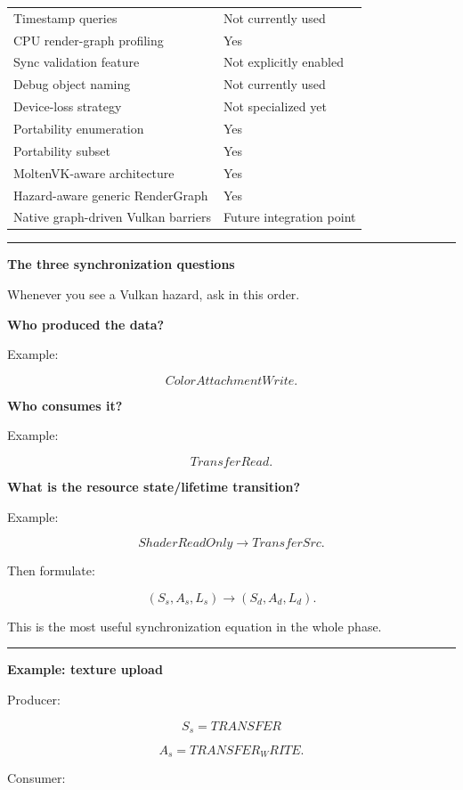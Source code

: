 {\begin{longtable}[]{@{}
  >{\raggedright\arraybackslash}p{}
  >{\raggedright\arraybackslash}p{}@{}}
Timestamp queries & Not currently used \\
CPU render-graph profiling & Yes \\
Sync validation feature & Not explicitly enabled \\
Debug object naming & Not currently used \\
Device-loss strategy & Not specialized yet \\
Portability enumeration & Yes \\
Portability subset & Yes \\
MoltenVK-aware architecture & Yes \\
Hazard-aware generic RenderGraph & Yes \\
Native graph-driven Vulkan barriers & Future integration point \\
\end{longtable}
}

\begin{center}\rule{0.5\linewidth}{0.5pt}\end{center}

\textbf{The three synchronization questions}

Whenever you see a Vulkan hazard, ask in this order.

\textbf{Who produced the data?}

Example:

\[
ColorAttachmentWrite.
\]

\textbf{Who consumes it?}

Example:

\[
TransferRead.
\]

\textbf{What is the resource state/lifetime transition?}

Example:

\[
ShaderReadOnly
\rightarrow
TransferSrc.
\]

Then formulate:

\[
(S_s,A_s,L_s)
\rightarrow
(S_d,A_d,L_d).
\]

This is the most useful synchronization equation in the whole phase.

\begin{center}\rule{0.5\linewidth}{0.5pt}\end{center}

\textbf{Example: texture upload}

Producer:

\[
S_s=TRANSFER
\]

\[
A_s=TRANSFER_WRITE.
\]

Consumer:

